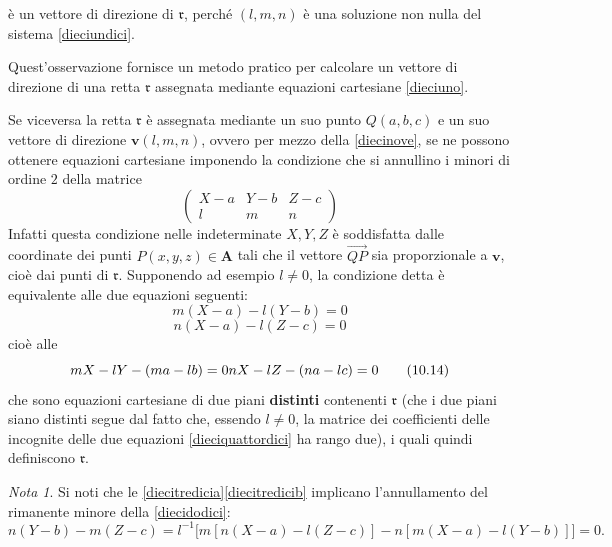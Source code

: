 \documentclass{article}
\theoremstyle{plain}
\theoremstyle{definition}
\theoremstyle{remark}
\newtheorem{note}{Nota}
\begin{document}
è un vettore di direzione di \( \mathfrak{r} \), perché \( (l, m, n) \) è una soluzione non nulla del sistema \ref{dieciundici}.

\vspace{10pt}

Quest'osservazione fornisce un metodo pratico per calcolare un vettore di direzione di una retta $\mathfrak{r}$ assegnata mediante equazioni cartesiane \ref{dieciuno}.

\vspace{10pt}

Se viceversa la retta $\mathfrak{r}$ è assegnata mediante un suo punto $Q(a, b, c)$ e un suo vettore di direzione $\mathbf{v}(l, m, n)$, 
ovvero per mezzo della \ref{diecinove}, se ne possono ottenere equazioni cartesiane imponendo la condizione che si annullino i minori 
di ordine $2$ della matrice
\begin{equation}\label{diecidodici}
\begin{pmatrix}
X - a & Y - b & Z - c \\
l & m & n
\end{pmatrix}    
\end{equation}
Infatti questa condizione nelle indeterminate $X, Y, Z$ è soddisfatta dalle coordinate dei punti $P(x, y, z) \in \mathbf{A}$ tali che il vettore $\overrightarrow{QP}$ sia proporzionale a $\mathbf{v}$, cioè dai punti di $\mathfrak{r}$.
Supponendo ad esempio $l \neq 0$, la condizione detta è equivalente alle due equazioni seguenti:
\begin{equation}\label{diecitredicia}
m(X - a) - l(Y - b) = 0 
\end{equation}
\begin{equation}\label{diecitredicib}
n(X - a) - l(Z - c) = 0 
\end{equation}
cioè alle
\begin{equation}\label{dieciquattordici}
mX - lY - (ma - lb) = 0 \\
nX - lZ - (na - lc) = 0 \tag{10.14}
\end{equation}
che sono equazioni cartesiane di due piani \textbf{distinti} contenenti $\mathfrak{r}$ 
(che i due piani siano distinti segue dal fatto che, essendo $l \neq 0$, la matrice dei coefficienti delle incognite delle 
due equazioni \ref{dieciquattordici} ha rango due), i quali quindi definiscono $\mathfrak{r}$.

\vspace{10pt}

\begin{note}
Si noti che le \ref{diecitredicia}\ref{diecitredicib} implicano l'annullamento del rimanente minore della \ref{diecidodici}:
\[
n(Y - b) - m(Z - c) = l^{-1} \big[ m[n(X - a) - l(Z - c)] - n[m(X - a) - l(Y - b)] \big] = 0.
\]    
\end{note}
\end{document}

